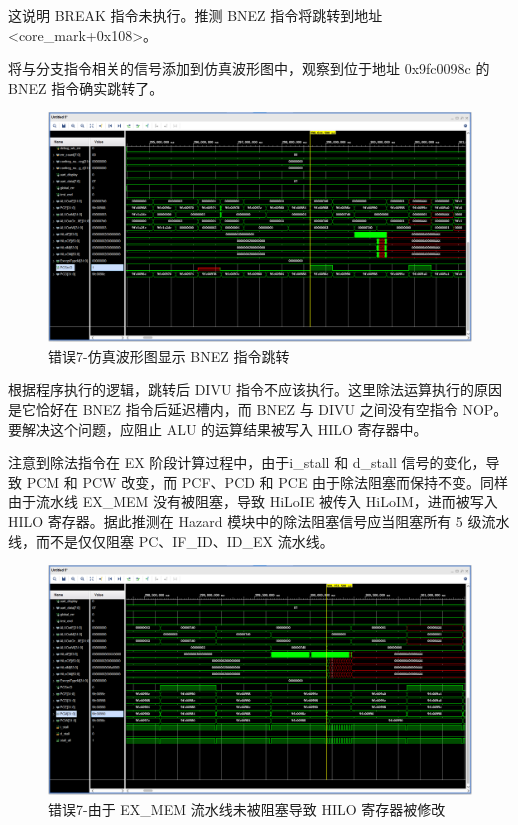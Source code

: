 \begin{enumerate}[(1)]
这说明 BREAK 指令未执行。推测 BNEZ 指令将跳转到地址 <core\_mark+0x108>。

将与分支指令相关的信号添加到仿真波形图中，观察到位于地址 0x9fc0098c 的 BNEZ 指令确实跳转了。

\begin{figure}[H]
    \centering
    \includegraphics[width=\textwidth]{image/错误7-分析定位过程4.png}
    \caption{错误7-仿真波形图显示 BNEZ 指令跳转}
    \label{fig:错误7-分析定位过程4}
\end{figure}

根据程序执行的逻辑，跳转后 DIVU 指令不应该执行。这里除法运算执行的原因是它恰好在 BNEZ 指令后延迟槽内，而 BNEZ 与 DIVU 之间没有空指令 NOP。要解决这个问题，应阻止 ALU 的运算结果被写入 HILO 寄存器中。

注意到除法指令在 EX 阶段计算过程中，由于i\_stall 和 d\_stall 信号的变化，导致 PCM 和 PCW 改变，而 PCF、PCD 和 PCE 由于除法阻塞而保持不变。同样由于流水线 EX\_MEM 没有被阻塞，导致 HiLoIE 被传入 HiLoIM，进而被写入 HILO 寄存器。据此推测在 Hazard 模块中的除法阻塞信号应当阻塞所有 5 级流水线，而不是仅仅阻塞 PC、IF\_ID、ID\_EX 流水线。

\begin{figure}[H]
    \centering
    \includegraphics[width=\textwidth]{image/错误7-分析定位过程5.png}
    \caption{错误7-由于 EX\_MEM 流水线未被阻塞导致 HILO 寄存器被修改}
    \label{fig:错误7-分析定位过程5}
\end{figure}


\end{enumerate}
